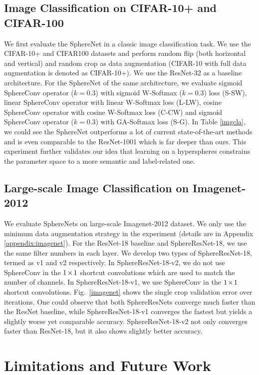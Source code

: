\subsection{Image Classification on CIFAR-10+ and CIFAR-100}

We first evaluate the SphereNet in a classic image classification task. We use the CIFAR-10+ and CIFAR100 datasets and perform random flip (both horizontal and vertical) and random crop as data augmentation (CIFAR-10 with full data augmentation is denoted as CIFAR-10+). We use the ResNet-32 as a baseline architecture. For the SphereNet of the same architecture, we evaluate sigmoid SphereConv operator ($k=0.3$) with sigmoid W-Softmax ($k=0.3$) loss (S-SW), linear SphereConv operator with linear W-Softmax loss (L-LW), cosine SphereConv operator with cosine W-Softmax loss (C-CW) and sigmoid SphereConv operator ($k=0.3$) with GA-Softmax loss (S-G). In Table \ref{imgcla}, we could see the SphereNet outperforms a lot of current state-of-the-art methods and is even comparable to the ResNet-1001 which is far deeper than ours. This experiment further validates our idea that learning on a hyperspheres constrains the parameter space to a more semantic and label-related one.

\subsection{Large-scale Image Classification on Imagenet-2012}

We evaluate SphereNets on large-scale Imagenet-2012 dataset. We only use the minimum data augmentation strategy in the experiment (details are in Appendix \ref{appendix:imagenet}). For the ResNet-18 baseline and SphereResNet-18, we use the same filter numbers in each layer. We develop two types of SphereResNet-18, termed as v1 and v2 respectively. In SphereResNet-18-v2, we do not use SphereConv in the $\thickmuskip=2mu \medmuskip=2mu 1\times1$ shortcut convolutions which are used to match the number of channels. In SphereResNet-18-v1, we use SphereConv in the $\thickmuskip=2mu \medmuskip=2mu 1\times1$ shortcut convolutions. Fig.~\ref{imagenet} shows the single crop validation error over iterations. One could observe that both SphereResNets converge much faster than the ResNet baseline, while SphereResNet-18-v1 converges the fastest but yields a slightly worse yet comparable accuracy. SphereResNet-18-v2 not only converges faster than ResNet-18, but it also shows slightly better accuracy.

\section{Limitations and Future Work}

